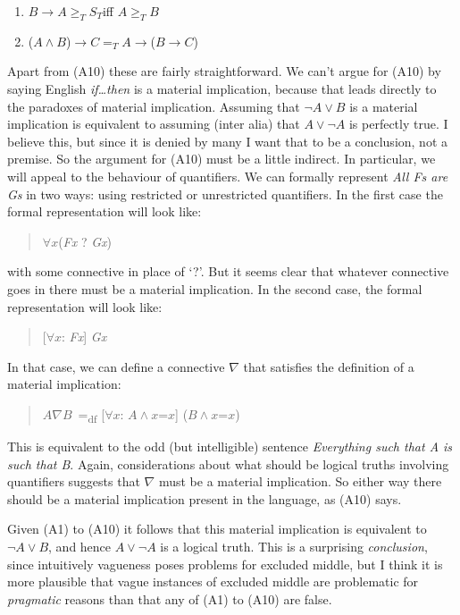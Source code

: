 \begin{description}
\begin{enumerate}
\item
  \(B \rightarrow A \geqslant _T S_T\)iff \(A \geqslant _T B\)
\item
  (\(A \wedge B\))\(\rightarrow C =_T A  \rightarrow\)(\(B \rightarrow C\))
\end{enumerate}
\end{description}

Apart from (A10) these are fairly straightforward. We can't argue for
(A10) by saying English \emph{if{\ldots{}}then} is a material
implication, because that leads directly to the paradoxes of material
implication. Assuming that \(\neg A \vee B\) is a material implication
is equivalent to assuming (inter alia) that \(A \vee \neg A\) is
perfectly true. I believe this, but since it is denied by many I want
that to be a conclusion, not a premise. So the argument for (A10) must
be a little indirect. In particular, we will appeal to the behaviour of
quantifiers. We can formally represent \emph{All Fs are Gs} in two ways:
using restricted or unrestricted quantifiers. In the first case the
formal representation will look like:

\begin{quote}
\(\forall x\)(\emph{Fx} ? \emph{Gx})
\end{quote}

with some connective in place of `?'. But it seems clear that whatever
connective goes in there must be a material implication. In the second
case, the formal representation will look like:

\begin{quote}
{[}\(\forall x\): \emph{Fx}{]} \emph{Gx}
\end{quote}

In that case, we can define a connective \(\nabla\) that satisfies the
definition of a material implication:

\begin{quote}
\(A \nabla B\)~=\textsubscript{df} {[}\(\forall x\):
\(A \wedge x\)=\(x\){]} (\(B \wedge x\)=\(x\))
\end{quote}

This is equivalent to the odd (but intelligible) sentence
\emph{Everything such that A is such that B}. Again, considerations
about what should be logical truths involving quantifiers suggests that
\(\nabla\) must be a material implication. So either way there should be
a material implication present in the language, as (A10) says.

Given (A1) to (A10) it follows that this material implication is
equivalent to \(\neg A \vee B\), and hence \(A \vee \neg A\) is a
logical truth. This is a surprising \emph{conclusion}, since intuitively
vagueness poses problems for excluded middle, but I think it is more
plausible that vague instances of excluded middle are problematic for
\emph{pragmatic} reasons than that any of (A1) to (A10) are false.

